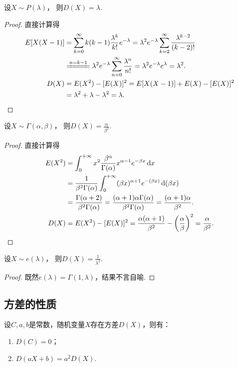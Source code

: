 \begin{proposition}
设\(X \sim P(\lambda)\)，
则\(D(X) = \lambda\).
\begin{proof}
直接计算得\begin{align*}
	E[X(X-1)]
	&= \sum_{k=0}^\infty {k(k-1) \frac{\lambda^k}{k!} e^{-\lambda}}
	= \lambda^2 e^{-\lambda} \sum_{k=2}^\infty {\frac{\lambda^{k-2}}{(k-2)!}} \\
	&\xlongequal{n=k-1} \lambda^2 e^{-\lambda} \sum_{n=0}^\infty {\frac{\lambda^n}{n!}}
	= \lambda^2 e^{-\lambda} e^\lambda = \lambda^2. \\
	D(X)
	&= E(X^2) - [E(X)]^2
	= E[X(X-1)] + E(X) - [E(X)]^2 \\
	&= \lambda^2 + \lambda - \lambda^2 = \lambda.
	\qedhere
\end{align*}
\end{proof}
\end{proposition}

\begin{proposition}\label{theorem:方差.伽马分布的方差}
设\(X \sim \Gamma(\alpha,\beta)\)，
则\(D(X) = \frac{\alpha}{\beta^2}\).
\begin{proof}
\def\inti{\int_0^{+\infty}}%
直接计算得
\begin{align*}
	E(X^2) &= \int_0^{+\infty} x^2
		\frac{\beta^\alpha}{\Gamma(\alpha)} x^{\alpha-1} e^{-\beta x} \dd{x} \\
	&= \frac{1}{\beta^2 \Gamma(\alpha)}
		\int_0^{+\infty} (\beta x)^{\alpha+1} e^{-(\beta x)} \dd(\beta x) \\
	&= \frac{\Gamma(\alpha+2)}{\beta^2 \Gamma(\alpha)}
	= \frac{(\alpha+1) \alpha \Gamma(\alpha)}{\beta^2 \Gamma(\alpha)}
	= \frac{(\alpha+1) \alpha}{\beta^2}. \\
	D(X) &= E(X^2) - [E(X)]^2
	= \frac{\alpha (\alpha+1)}{\beta^2} - \left( \frac{\alpha}{\beta} \right)^2
	= \frac{\alpha}{\beta^2}.
	\qedhere
\end{align*}
\end{proof}
\end{proposition}

\begin{proposition}\label{theorem:方差.指数分布的方差}
设\(X \sim e(\lambda)\)，
则\(D(X) = \frac{1}{\lambda^2}\).
\begin{proof}
既然\(e(\lambda) = \Gamma(1,\lambda)\)，结果不言自喻.
\end{proof}
\end{proposition}

\subsection{方差的性质}
\begin{property}\label{theorem:随机变量的数字特征.方差的性质1}
设\(C,a,b\)是常数，随机变量\(X\)存在方差\(D(X)\)，则有：
\begin{enumerate}
	\item \(D(C) = 0\)；
	\item \(D(aX+b) = a^2 D(X)\).
\end{enumerate}
\end{property}

